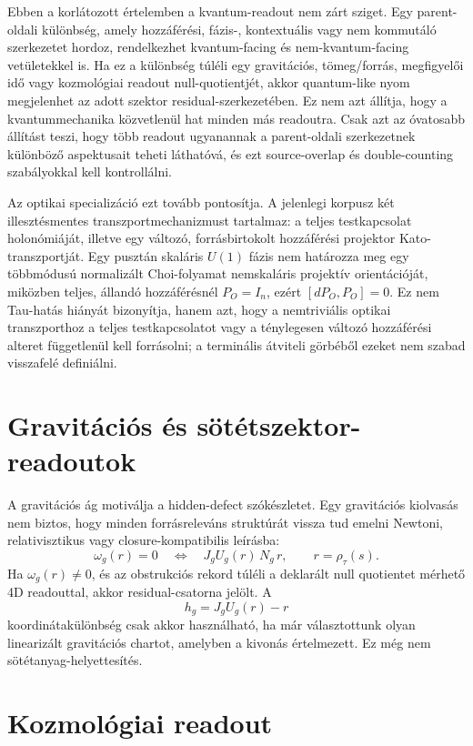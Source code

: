 \documentclass[12pt]{article}
\newcommand{\Rmap}{\rho_{\tau}}
\begin{document}
Ebben a korlátozott értelemben a kvantum-readout nem zárt sziget.  Egy
parent-oldali különbség, amely hozzáférési, fázis-, kontextuális vagy nem
kommutáló szerkezetet hordoz, rendelkezhet kvantum-facing és nem-kvantum-facing
vetületekkel is.  Ha ez a különbség túléli egy gravitációs, tömeg/forrás,
megfigyelői idő vagy kozmológiai readout null-quotientjét, akkor quantum-like
nyom megjelenhet az adott szektor residual-szerkezetében.  Ez nem azt állítja,
hogy a kvantummechanika közvetlenül hat minden más readoutra.  Csak azt az
óvatosabb állítást teszi, hogy több readout ugyanannak a parent-oldali
szerkezetnek különböző aspektusait teheti láthatóvá, és ezt source-overlap és
double-counting szabályokkal kell kontrollálni.

Az optikai specializáció ezt tovább pontosítja. A jelenlegi korpusz két
illesztésmentes transzportmechanizmust tartalmaz: a teljes testkapcsolat
holonómiáját, illetve egy változó, forrásbirtokolt hozzáférési projektor
Kato-transzportját. Egy pusztán skaláris $U(1)$ fázis nem határozza meg egy
többmódusú normalizált Choi-folyamat nemskaláris projektív orientációját,
miközben teljes, állandó hozzáférésnél $P_O=I_n$, ezért
$[dP_O,P_O]=0$. Ez nem Tau-hatás hiányát bizonyítja, hanem azt, hogy a
nemtriviális optikai transzporthoz a teljes testkapcsolatot vagy a ténylegesen
változó hozzáférési alteret függetlenül kell forrásolni; a terminális
átviteli görbéből ezeket nem szabad visszafelé definiálni.

\section{Gravitációs és sötétszektor-readoutok}

A gravitációs ág motiválja a hidden-defect szókészletet.  Egy gravitációs
kiolvasás nem biztos, hogy minden forrásreleváns struktúrát vissza tud emelni
Newtoni, relativisztikus vagy closure-kompatibilis leírásba:
\begin{equation}
  \omega_g(r)=0
  \quad\Longleftrightarrow\quad
  J_gU_g(r)\,N_g\,r,
  \qquad r=\Rmap(s).
\end{equation}
Ha \(\omega_g(r)\neq0\), és az obstrukciós rekord túléli a deklarált null
quotientet mérhető 4D readouttal, akkor residual-csatorna jelölt.  A
\[
  h_g=J_gU_g(r)-r
\]
koordinátakülönbség csak akkor használható, ha már választottunk olyan
linearizált gravitációs chartot, amelyben a kivonás értelmezett.  Ez még nem
sötétanyag-helyettesítés.

\section{Kozmológiai readout}
\end{document}

